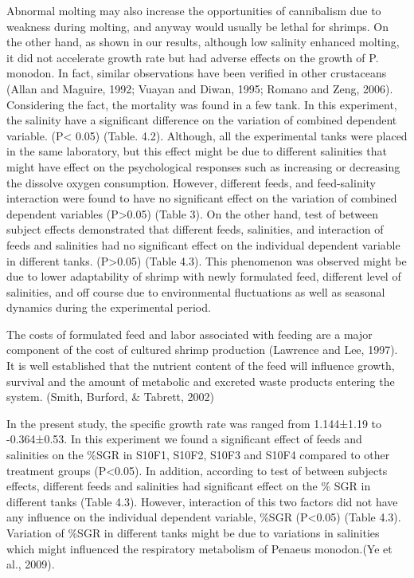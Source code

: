 \documentclass[
]{book}
\begin{document}
Abnormal molting may also increase the opportunities of cannibalism due to weakness during
molting, and anyway would usually be lethal for shrimps. On the other hand, as shown in our
results, although low salinity enhanced molting, it did not accelerate growth rate but had adverse
effects on the growth of P. monodon. In fact, similar observations have been verified in other
crustaceans (Allan and Maguire, 1992; Vuayan and Diwan, 1995; Romano and Zeng, 2006).
Considering the fact, the mortality was found in a few tank. In this experiment, the salinity have a
significant difference on the variation of combined dependent variable. (P\textless{} 0.05) (Table. 4.2).
Although, all the experimental tanks were placed in the same laboratory, but this effect might be
due to different salinities that might have effect on the psychological responses such as increasing
or decreasing the dissolve oxygen consumption. However, different feeds, and feed-salinity
interaction were found to have no significant effect on the variation of combined dependent
variables (P\textgreater0.05) (Table 3). On the other hand, test of between subject effects demonstrated that
different feeds, salinities, and interaction of feeds and salinities had no significant effect on the
individual dependent variable in different tanks. (P\textgreater0.05) (Table 4.3). This phenomenon was
observed might be due to lower adaptability of shrimp with newly formulated feed, different level
of salinities, and off course due to environmental fluctuations as well as seasonal dynamics during
the experimental period.

The costs of formulated feed and labor associated with feeding are a major component of the cost
of cultured shrimp production (Lawrence and Lee, 1997). It is well established that the nutrient
content of the feed will influence growth, survival and the amount of metabolic and excreted waste
products entering the system. (Smith, Burford, \& Tabrett, 2002)

In the present study, the specific growth rate was ranged from 1.144±1.19 to -0.364±0.53. In this
experiment we found a significant effect of feeds and salinities on the \%SGR in S10F1, S10F2,
S10F3 and S10F4 compared to other treatment groups (P\textless0.05). In addition, according to test of
between subjects effects, different feeds and salinities had significant effect on the \% SGR in
different tanks (Table 4.3). However, interaction of this two factors did not have any influence on
the individual dependent variable, \%SGR (P\textless0.05) (Table 4.3). Variation of \%SGR in different
tanks might be due to variations in salinities which might influenced the respiratory metabolism
of Penaeus monodon.(Ye et al., 2009).
\end{document}
